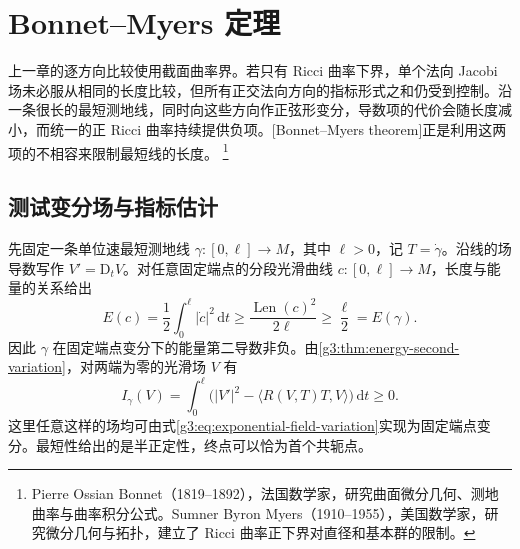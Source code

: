 
% 
% 

\section{Bonnet–Myers 定理}
\label{g3:sec:0801}

上一章的逐方向比较使用截面曲率界。若只有 Ricci 曲率下界，单个法向 Jacobi 场未必服从相同的长度比较，但所有正交法向方向的指标形式之和仍受到控制。沿一条很长的最短测地线，同时向这些方向作正弦形变分，导数项的代价会随长度减小，而统一的正 Ricci 曲率持续提供负项。[Bonnet--Myers theorem]正是利用这两项的不相容来限制最短线的长度。
\footnote{Pierre Ossian Bonnet（1819--1892），法国数学家，研究曲面微分几何、测地曲率与曲率积分公式。Sumner Byron Myers（1910--1955），美国数学家，研究微分几何与拓扑，建立了 Ricci 曲率正下界对直径和基本群的限制。}

\subsection{测试变分场与指标估计}
\label{g3:subsec:0801:01}

先固定一条单位速最短测地线 \(\gamma:[0,\ell]\to M\)，其中 \(\ell>0\)，记 \(T=\dot\gamma\)。沿线的场导数写作 \(V'=\mathrm{D}_tV\)。对任意固定端点的分段光滑曲线 \(c:[0,\ell]\to M\)，长度与能量的关系给出
\[
	E(c)=\frac12\int_0^\ell|\dot c|^2\,\mathrm{d}t
	\ge\frac{\operatorname{Len}(c)^2}{2\ell}
	\ge\frac{\ell}{2}=E(\gamma).
\]
因此 \(\gamma\) 在固定端点变分下的能量第二导数非负。由\cref{g3:thm:energy-second-variation}，对两端为零的光滑场 \(V\) 有
\[
	I_\gamma(V)=\int_0^\ell
	\bigl(|V'|^2-\langle R(V,T)T,V\rangle\bigr)\,\mathrm{d}t\ge0.
\]
这里任意这样的场均可由式\eqref{g3:eq:exponential-field-variation}实现为固定端点变分。最短性给出的是半正定性，终点可以恰为首个共轭点。


